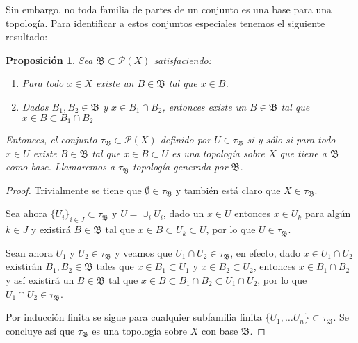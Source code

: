 \documentclass[12pt]{article}
\newtheorem{proposition}[theorem]{Proposición}
\begin{document}
Sin embargo, no toda familia de partes de un conjunto es una base para una topología. Para identificar a estos conjuntos especiales tenemos el siguiente resultado:

\begin{proposition}\label{eq:condBase} Sea $\mathfrak{B} \subset \mathcal{P}(X)$ satisfaciendo: 
\begin{enumerate}
\item Para todo $x \in X$ existe un $B \in \mathfrak{B}$ tal que $x \in B$.
\item Dados $B_1, B_2 \in \mathfrak{B}$ y $x \in B_1 \cap B_2$, entonces existe un $B \in \mathfrak{B}$ tal que $x \in B \subset B_1 \cap B_2$
\end{enumerate}
Entonces, el conjunto $\tau_{\mathfrak{B}} \subset \mathcal{P}(X)$ definido por $U \in \tau_{\mathfrak{B}}$ si y sólo si para todo $x \in U$ existe $B \in \mathfrak{B}$ tal que $x \in B \subset U$ es una topología sobre $X$ que tiene a $\mathfrak{B}$ como base. Llamaremos a $\tau_{\mathfrak{B}}$ topología generada por $\mathfrak{B}$.
\end{proposition}
\begin{proof}Trivialmente se tiene que $\emptyset \in \tau_{\mathfrak{B}}$ y también está claro que $X \in \tau_{\mathfrak{B}}$. 

Sea ahora $\lbrace U_i\rbrace_{i\in J} \subset \tau_{\mathfrak{B}}$ y $U = \cup_i U_i$, dado un $x \in U$ entonces $x \in U_k$ para algún $k \in J$ y existirá $B \in \mathfrak{B}$ tal que $x \in B \subset U_k \subset U$, por lo que $U \in \tau_{\mathfrak{B}}$. 

Sean ahora $U_1$ y $U_2 \in \tau_{\mathfrak{B}}$ y veamos que $U_1 \cap U_2 \in \tau_{\mathfrak{B}}$, en efecto, dado $x \in U_1 \cap U_2$ existirán $B_1, B_2 \in \mathfrak{B}$ tales que $x \in B_1 \subset U_1$ y $x \in B_2 \subset U_2$, entonces $x \in B_1 \cap B_2$ y así existirá un $B \in \mathfrak{B}$ tal que $x \in B \subset B_1 \cap B_2 \subset U_1 \cap U_2$, por lo que $U_1 \cap U_2 \in \tau_{\mathfrak{B}}$. 

Por inducción finita se sigue para cualquier subfamilia finita $\lbrace U_1, \ldots U_n \rbrace \subset \tau_{\mathfrak{B}}$. Se concluye así que $\tau_{\mathfrak{B}}$ es una topología sobre $X$ con base $\mathfrak{B}$.

\end{proof}
\end{document}
